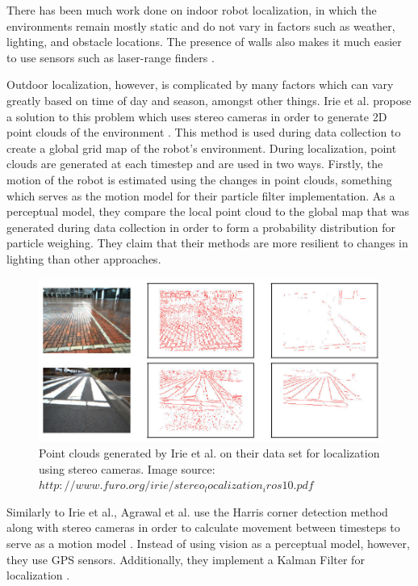 \documentclass[letterpaper, 12 pt, conference]{ieeeconf}  %
\begin{document}
There has been much work done on indoor robot localization, in which the environments remain mostly static and do not vary in factors such as weather, lighting, and obstacle locations. The presence of walls also makes it much easier to use sensors such as laser-range finders \cite{laser_range}. 
\par
Outdoor localization, however, is complicated by many factors which can vary greatly based on time of day and season, amongst other things. Irie et al. propose a solution to this problem which uses stereo cameras in order to generate 2D point clouds of the environment \cite{irie2010mobile}. This method is used during data collection to create a global grid map of the robot's environment. During localization, point clouds are generated at each timestep and are used in two ways. Firstly, the motion of the robot is estimated using the changes in point clouds, something which serves as the motion model for their particle filter implementation. As a perceptual model, they compare the local point cloud to the global map that was generated during data collection in order to form a probability distribution for particle weighing. They claim that their methods are more resilient to changes in lighting than other approaches.
\begin{figure}[h]
\centering
\includegraphics[scale=0.25]{point_clouds}
\caption{Point clouds generated by Irie et al. on their data set for localization using stereo cameras. Image source: $http://www.furo.org/irie/stereo_localization_iros10.pdf$}
\end{figure}

\par
Similarly to Irie et al., Agrawal et al. use the Harris corner detection method \cite{Harris} along with stereo cameras in order to calculate movement between timesteps to serve as a motion model \cite{agrawal2006real}. Instead of using vision as a perceptual model, however, they use GPS sensors. Additionally, they implement a Kalman Filter for localization \cite{Kalman}.
\end{document}
